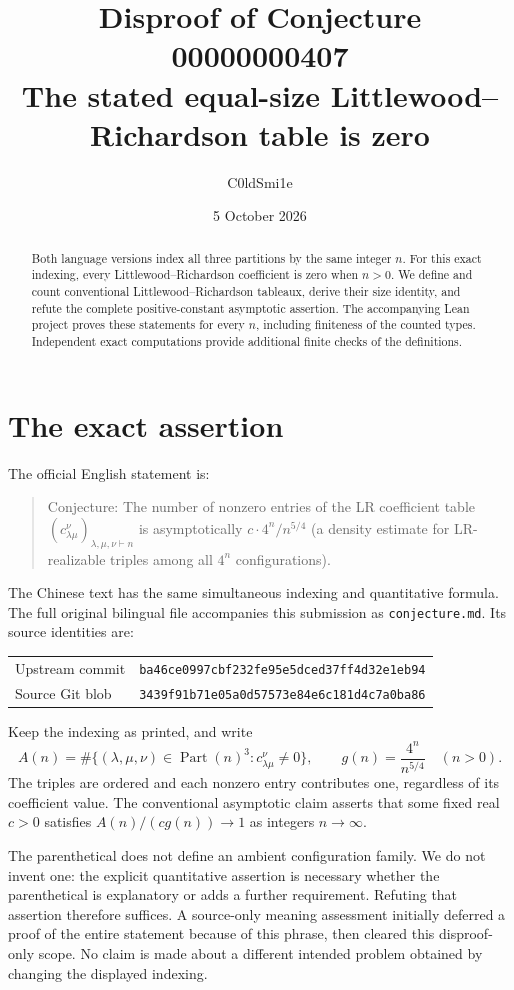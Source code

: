 \documentclass[11pt]{article}
\title{Disproof of Conjecture 00000000407\\[0.3em]
\large The stated equal-size Littlewood--Richardson table is zero}
\author{C0ldSmi1e}
\date{5 October 2026}
\newcommand{\Part}{\operatorname{Part}}
\begin{document}
\maketitle
\begin{abstract}
Both language versions index all three partitions by the same integer $n$.
For this exact indexing, every Littlewood--Richardson coefficient is zero
when $n>0$. We define and count conventional Littlewood--Richardson tableaux,
derive their size identity, and refute the complete positive-constant
asymptotic assertion. The accompanying Lean project proves these statements
for every $n$, including finiteness of the counted types. Independent exact
computations provide additional finite checks of the definitions.
\end{abstract}

\section{The exact assertion}
The official English statement is:
\begin{quote}
Conjecture: The number of nonzero entries of the LR coefficient table
$(c^\nu_{\lambda\mu})_{\lambda,\mu,\nu\vdash n}$ is asymptotically
$c\cdot4^n/n^{5/4}$ (a density estimate for LR-realizable triples among all
$4^n$ configurations).
\end{quote}
The Chinese text has the same simultaneous indexing and quantitative formula.
The full original bilingual file accompanies this submission as
\texttt{conjecture.md}. Its source identities are:
\begin{center}\small
\begin{tabular}{@{}ll@{}}
Upstream commit & \texttt{ba46ce0997cbf232fe95e5dced37ff4d32e1eb94}\\
Source Git blob & \texttt{3439f91b71e05a0d57573e84e6c181d4c7a0ba86}
\end{tabular}
\end{center}

Keep the indexing as printed, and write
\[
 A(n)=\#\{(\lambda,\mu,\nu)\in\Part(n)^3:
                   c^\nu_{\lambda\mu}\ne0\},\qquad
 g(n)=\frac{4^n}{n^{5/4}}\quad(n>0).
\]
The triples are ordered and each nonzero entry contributes one, regardless
of its coefficient value. The conventional asymptotic claim asserts that
some fixed real $c>0$ satisfies $A(n)/(c g(n))\to1$ as integers $n\to\infty$.

The parenthetical does not define an ambient configuration family. We do
not invent one: the explicit quantitative assertion is necessary whether
the parenthetical is explanatory or adds a further requirement. Refuting
that assertion therefore suffices. A source-only meaning assessment initially
deferred a proof of the entire statement because of this phrase, then cleared
this disproof-only scope. No claim is made about a different intended problem
obtained by changing the displayed indexing.
\end{document}

